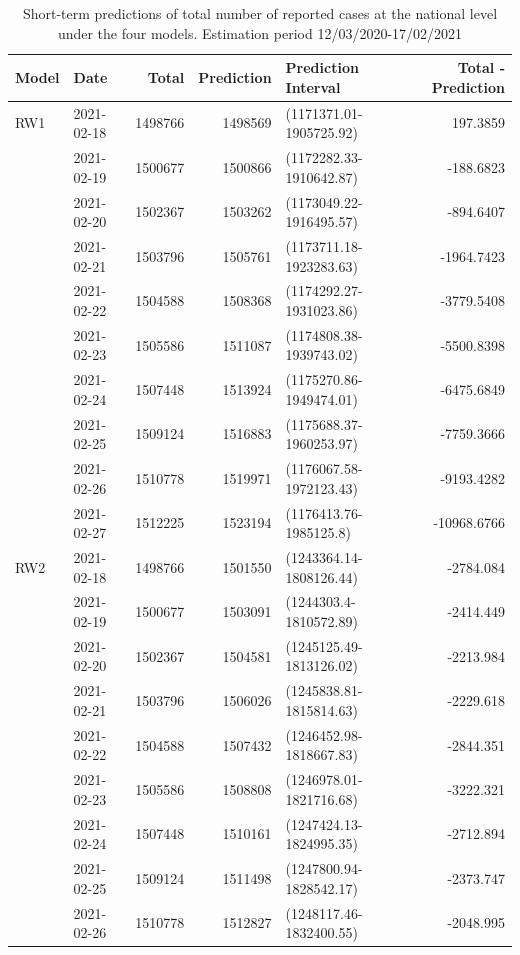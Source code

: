 \documentclass[10pt,letterpaper]{article}
\begin{document}
\begin{table}[!h]

\caption{\label{tab:unnamed-chunk-10}Short-term predictions of total number of reported cases at the national level under the four models. Estimation period 12/03/2020-17/02/2021}
\centering
\begin{tabular}[t]{l|l|r|r|l|r}
\hline
Model&Date & Total & Prediction & Prediction Interval & Total - Prediction\\
\hline
RW1&2021-02-18 & 1498766 & 1498569 & (1171371.01-1905725.92) & 197.3859\\
&2021-02-19 & 1500677 & 1500866 & (1172282.33-1910642.87) & -188.6823\\
&2021-02-20 & 1502367 & 1503262 & (1173049.22-1916495.57) & -894.6407\\
&2021-02-21 & 1503796 & 1505761 & (1173711.18-1923283.63) & -1964.7423\\
&2021-02-22 & 1504588 & 1508368 & (1174292.27-1931023.86) & -3779.5408\\
&2021-02-23 & 1505586 & 1511087 & (1174808.38-1939743.02) & -5500.8398\\
&2021-02-24 & 1507448 & 1513924 & (1175270.86-1949474.01) & -6475.6849\\
&2021-02-25 & 1509124 & 1516883 & (1175688.37-1960253.97) & -7759.3666\\
&2021-02-26 & 1510778 & 1519971 & (1176067.58-1972123.43) & -9193.4282\\
&2021-02-27 & 1512225 & 1523194 & (1176413.76-1985125.8) & -10968.6766\\
\hline
RW2&2021-02-18 & 1498766 & 1501550 & (1243364.14-1808126.44) & -2784.084\\
&2021-02-19 & 1500677 & 1503091 & (1244303.4-1810572.89) & -2414.449\\
&2021-02-20 & 1502367 & 1504581 & (1245125.49-1813126.02) & -2213.984\\
&2021-02-21 & 1503796 & 1506026 & (1245838.81-1815814.63) & -2229.618\\
&2021-02-22 & 1504588 & 1507432 & (1246452.98-1818667.83) & -2844.351\\
&2021-02-23 & 1505586 & 1508808 & (1246978.01-1821716.68) & -3222.321\\
&2021-02-24 & 1507448 & 1510161 & (1247424.13-1824995.35) & -2712.894\\
&2021-02-25 & 1509124 & 1511498 & (1247800.94-1828542.17) & -2373.747\\
&2021-02-26 & 1510778 & 1512827 & (1248117.46-1832400.55) & -2048.995\\

\end{tabular}
\end{table}
\end{document}
